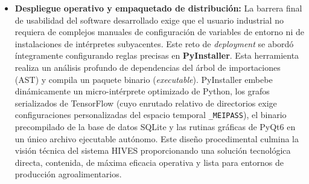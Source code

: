 \begin{itemize}
    \item \textbf{Despliegue operativo y empaquetado de distribución:} La barrera final de usabilidad del software desarrollado exige que el usuario industrial no requiera de complejos manuales de configuración de variables de entorno ni de instalaciones de intérpretes subyacentes. Este reto de \textit{deployment} se abordó íntegramente configurando reglas precisas en \textbf{PyInstaller\cite{pyinstaller2024docs}}. Esta herramienta realiza un análisis profundo de dependencias del árbol de importaciones (AST) y compila un paquete binario (\textit{executable}). PyInstaller embebe dinámicamente un micro-intérprete optimizado de Python, los grafos serializados de TensorFlow (cuyo enrutado relativo de directorios exige configuraciones personalizadas del espacio temporal \texttt{\_MEIPASS}), el binario precompilado de la base de datos SQLite y las rutinas gráficas de PyQt6 en un único archivo ejecutable autónomo. Este diseño procedimental culmina la visión técnica del sistema HIVES proporcionando una solución tecnológica directa, contenida, de máxima eficacia operativa y lista para entornos de producción agroalimentarios.
\end{itemize}